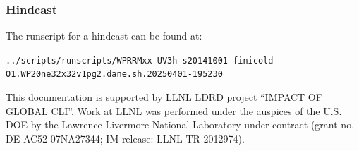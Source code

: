 \documentclass[journal abbreviation, manuscript]{copernicus}
\begin{document}
\subsubsection{Hindcast}
The runscript for a hindcast can be found at:

\lstinline|../scripts/runscripts/WPRRMxx-UV3h-s20141001-finicold-O1.WP20ne32x32v1pg2.dane.sh.20250401-195230|













\newpage

\begin{acknowledgements}
This documentation is supported by LLNL LDRD project ``IMPACT OF GLOBAL CLI''. Work at LLNL was performed under the auspices of the U.S. DOE by the Lawrence Livermore National Laboratory under contract (grant no. DE-AC52-07NA27344; IM release: LLNL-TR-2012974).
\end{acknowledgements}
\end{document}
